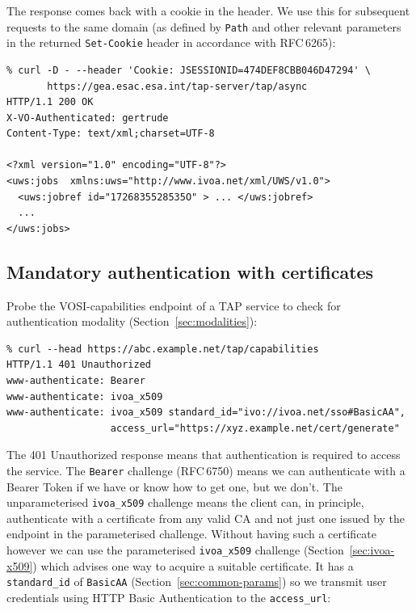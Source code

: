 \documentclass[11pt,a4paper]{ivoa}
\newcommand{\rfc}[1]{RFC\,#1}
\newcommand{\header}[1]{{\tt #1}}
\begin{document}
\noindent
The response comes back with a cookie in the header.
We use this for subsequent requests to the same domain
(as defined by {\tt Path} and other relevant parameters in the
returned \header{Set-Cookie} header in accordance with \rfc{6265}):
{\footnotesize
\begin{verbatim}
% curl -D - --header 'Cookie: JSESSIONID=474DEF8CBB046D47294' \
       https://gea.esac.esa.int/tap-server/tap/async
HTTP/1.1 200 OK
X-VO-Authenticated: gertrude
Content-Type: text/xml;charset=UTF-8

<?xml version="1.0" encoding="UTF-8"?>
<uws:jobs  xmlns:uws="http://www.ivoa.net/xml/UWS/v1.0">
  <uws:jobref id="1726835528535O" > ... </uws:jobref>
  ...
</uws:jobs>
\end{verbatim}
}

\subsection{Mandatory authentication with certificates}
\label{sec:x509-example}


Probe the VOSI-capabilities endpoint of a TAP service to check
for authentication modality (Section~\ref{sec:modalities}):
{\footnotesize
\begin{verbatim}
% curl --head https://abc.example.net/tap/capabilities
HTTP/1.1 401 Unauthorized
www-authenticate: Bearer
www-authenticate: ivoa_x509
www-authenticate: ivoa_x509 standard_id="ivo://ivoa.net/sso#BasicAA",
                  access_url="https://xyz.example.net/cert/generate"
\end{verbatim}
}

\noindent
The 401 Unauthorized response means that authentication
is required to access the service.
The \verb|Bearer| challenge (\rfc{6750}) means we can authenticate with
a Bearer Token if we have or know how to get one, but we don't.
The unparameterised \verb|ivoa_x509| challenge means
the client can, in principle, authenticate with a certificate
from any valid CA and not just one issued by the endpoint in the
parameterised challenge.  
Without having such a certificate however we can use
the parameterised \verb|ivoa_x509| challenge
(Section~\ref{sec:ivoa-x509}) which advises one way to acquire
a suitable certificate.
It has a \verb|standard_id| of \verb|BasicAA| (Section~\ref{sec:common-params})
so we transmit user credentials using
HTTP Basic Authentication to the \verb|access_url|:
\end{document}

